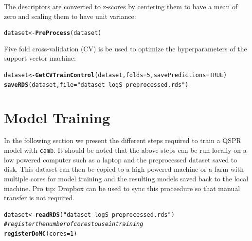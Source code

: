 \documentclass[twoside,a4wide,12pt]{article}\usepackage[]{graphicx}\usepackage[]{color}
\makeatletter
\newcommand{\hlnum}[1]{\textcolor[rgb]{0.686,0.059,0.569}{#1}}%
\newcommand{\hlstr}[1]{\textcolor[rgb]{0.192,0.494,0.8}{#1}}%
\newcommand{\hlcom}[1]{\textcolor[rgb]{0.678,0.584,0.686}{\textit{#1}}}%
\newcommand{\hlstd}[1]{\textcolor[rgb]{0.345,0.345,0.345}{#1}}%
\newcommand{\hlkwb}[1]{\textcolor[rgb]{0.69,0.353,0.396}{#1}}%
\newcommand{\hlkwc}[1]{\textcolor[rgb]{0.333,0.667,0.333}{#1}}%
\newcommand{\hlkwd}[1]{\textcolor[rgb]{0.737,0.353,0.396}{\textbf{#1}}}%
\newenvironment{kframe}{%
 \def\at@end@of@kframe{}%
 \ifinner\ifhmode%
  \def\at@end@of@kframe{\end{minipage}}%
  \begin{minipage}{\columnwidth}%
 \fi\fi%
 \def\FrameCommand##1{\hskip\@totalleftmargin \hskip-\fboxsep
 \colorbox{shadecolor}{##1}\hskip-\fboxsep
     \hskip-\linewidth \hskip-\@totalleftmargin \hskip\columnwidth}%
 \MakeFramed {\advance\hsize-\width
   \@totalleftmargin\z@ \linewidth\hsize
   \@setminipage}}%
 {\par\unskip\endMakeFramed%
 \at@end@of@kframe}
\newenvironment{knitrout}{}{} %
\makeatother
\begin{document}
The descriptors are converted to z-scores by centering them to have a mean of zero and scaling them to have unit variance:
\begin{knitrout}
\color{fgcolor}\begin{kframe}
\begin{alltt}
\hlstd{dataset} \hlkwb{<-} \hlkwd{PreProcess}\hlstd{(dataset)}
\end{alltt}
\end{kframe}
\end{knitrout}

Five fold cross-validation (CV) is be used to optimize the hyperparameters of the support vector machine:
\begin{knitrout}
\color{fgcolor}\begin{kframe}
\begin{alltt}
\hlstd{dataset} \hlkwb{<-} \hlkwd{GetCVTrainControl}\hlstd{(dataset,} \hlkwc{folds} \hlstd{=} \hlnum{5}\hlstd{,} \hlkwc{savePredictions} \hlstd{=} \hlnum{TRUE}\hlstd{)}
\hlkwd{saveRDS}\hlstd{(dataset,} \hlkwc{file} \hlstd{=} \hlstr{"dataset_logS_preprocessed.rds"}\hlstd{)}
\end{alltt}
\end{kframe}
\end{knitrout}

\section{Model Training}

In the following section we present the different steps required to train a QSPR model with \texttt{camb}. It should be noted that the above steps can be run locally on a low powered computer such as a laptop and the preprocessed dataset saved to disk. This dataset can then be copied to a high powered machine or a farm with multiple cores for model training and the resulting models saved back to the local machine. Pro tip: Dropbox can be used to sync this proceedure so that manual transfer is not required.

\begin{knitrout}
\color{fgcolor}\begin{kframe}
\begin{alltt}
\hlstd{dataset} \hlkwb{<-} \hlkwd{readRDS}\hlstd{(}\hlstr{"dataset_logS_preprocessed.rds"}\hlstd{)}
\hlcom{# register the number of cores to use in training}
\hlkwd{registerDoMC}\hlstd{(}\hlkwc{cores} \hlstd{=} \hlnum{1}\hlstd{)}
\end{alltt}
\end{kframe}
\end{knitrout}
\end{document}
